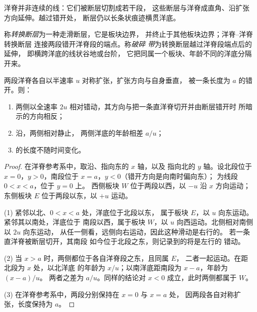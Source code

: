 洋脊并非连续的线：它们被断层切割成若干段，
这些断层与洋脊成直角、沿扩张方向延伸。越过错开处，
断层仍以长条状痕迹横贯洋底。

\begin{definition}\label{def:b1:rifts-ridges-margins:transform}
称\emph{转换断层}为一种走滑断层，它是板块边界，
并终止于其他板块边界；洋脊–洋脊转换断层
连接两段错开洋脊段的端点。称\emph{破碎
带}为转换断层越过洋脊段端点后的延伸，
即横跨洋底的线状谷地或台阶，
它把同属一个板块、年龄不同的洋底分隔开来。
\end{definition}

\begin{proposition}[洋脊–洋脊转换断层上的滑动]\label{prop:b1:rifts-ridges-margins:transform}
两段洋脊各自以半速率 $u$ 对称扩张，扩张方向与自身垂直，
被一条长度为 $a$ 的错开。则：
\begin{enumerate}
  \item {}两侧以全速率
        $2u$ 相对错动，其方向与把一条直洋脊切开并由断层错开时
        所暗示的方向相反；
  \item 沿，两侧相对静止，
        两侧洋底的年龄相差 $a/u$；
  \item {}的长度不随时间变化。
\end{enumerate}
\end{proposition}

\begin{proof}
在洋脊参考系中，取沿、指向东的 $x$ 轴，以及
指向北的 $y$ 轴。设北段位于
$x = 0$，$y > 0$，南段位于 $x = a$，$y < 0$（错开方向是向南时偏向东）；
为线段 $0 < x < a$，位于 $y = 0$ 上。
西侧板块 $W$ 位于两段以西，以 $-u$ 沿 $x$ 方向运动；
东侧板块 $E$ 位于两段以东，以 $+u$ 运动。

(1) 紧邻以北、$0 < x < a$ 处，洋底位于北段以东，
属于板块 $E$，以 $u$ 向东运动。紧邻其以南处，洋底位于
南段以西，属于板块 $W$，以
$u$ 向西运动。北侧相对南侧以 $2u$ 向东运动，
从任一侧看，远侧向右运动，因此这种滑动是右行的。
若一条直洋脊被断层切开，其南段
如今位于北段之东，则记录到的将是左行的
错动。

(2) 当 $x > a$ 时，两侧都位于各自洋脊段之东，且同属 $E$，
二者一起运动。在距北段为 $x$ 处，以北洋底
的年龄为 $x/u$；以南洋底距南段为 $x - a$，年龄为 $(x - a)/u$。
两者之差为 $a/u$。同样的结论对
$x < 0$ 成立，此时两侧都属于 $W$。

(3) 在洋脊参考系中，两段分别保持在 $x = 0$ 与 $x = a$ 处，
因两段各自对称扩张，长度保持为 $a$。
\end{proof}

